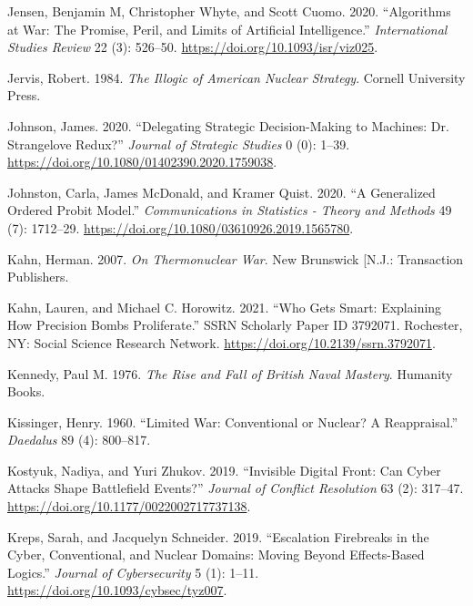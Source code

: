 \documentclass[
]{article}
\begin{document}
\leavevmode\hypertarget{ref-jensen_algorithmswarpromise_2020}{}%
Jensen, Benjamin M, Christopher Whyte, and Scott Cuomo. 2020. ``Algorithms at War: The Promise, Peril, and Limits of Artificial Intelligence.'' \emph{International Studies Review} 22 (3): 526--50. \url{https://doi.org/10.1093/isr/viz025}.

\leavevmode\hypertarget{ref-jervis_illogicamericannuclear_1984}{}%
Jervis, Robert. 1984. \emph{The Illogic of American Nuclear Strategy}. Cornell University Press.

\leavevmode\hypertarget{ref-johnson_delegatingstrategicdecisionmaking_2020}{}%
Johnson, James. 2020. ``Delegating Strategic Decision-Making to Machines: Dr. Strangelove Redux?'' \emph{Journal of Strategic Studies} 0 (0): 1--39. \url{https://doi.org/10.1080/01402390.2020.1759038}.

\leavevmode\hypertarget{ref-johnston_generalizedorderedprobit_2020}{}%
Johnston, Carla, James McDonald, and Kramer Quist. 2020. ``A Generalized Ordered Probit Model.'' \emph{Communications in Statistics - Theory and Methods} 49 (7): 1712--29. \url{https://doi.org/10.1080/03610926.2019.1565780}.

\leavevmode\hypertarget{ref-kahn_thermonuclearwar_2007}{}%
Kahn, Herman. 2007. \emph{On Thermonuclear War}. New Brunswick {[}N.J.: Transaction Publishers.

\leavevmode\hypertarget{ref-kahn_whogetssmart_2021}{}%
Kahn, Lauren, and Michael C. Horowitz. 2021. ``Who Gets Smart: Explaining How Precision Bombs Proliferate.'' SSRN Scholarly Paper ID 3792071. Rochester, NY: Social Science Research Network. \url{https://doi.org/10.2139/ssrn.3792071}.

\leavevmode\hypertarget{ref-kennedy_risefallbritish_1976}{}%
Kennedy, Paul M. 1976. \emph{The Rise and Fall of British Naval Mastery}. Humanity Books.

\leavevmode\hypertarget{ref-kissinger_limitedwarconventional_1960}{}%
Kissinger, Henry. 1960. ``Limited War: Conventional or Nuclear? A Reappraisal.'' \emph{Daedalus} 89 (4): 800--817.

\leavevmode\hypertarget{ref-kostyuk_invisibledigitalfront_2019}{}%
Kostyuk, Nadiya, and Yuri Zhukov. 2019. ``Invisible Digital Front: Can Cyber Attacks Shape Battlefield Events?'' \emph{Journal of Conflict Resolution} 63 (2): 317--47. \url{https://doi.org/10.1177/0022002717737138}.

\leavevmode\hypertarget{ref-kreps_escalationfirebreakscyber_2019}{}%
Kreps, Sarah, and Jacquelyn Schneider. 2019. ``Escalation Firebreaks in the Cyber, Conventional, and Nuclear Domains: Moving Beyond Effects-Based Logics.'' \emph{Journal of Cybersecurity} 5 (1): 1--11. \url{https://doi.org/10.1093/cybsec/tyz007}.
\end{document}
